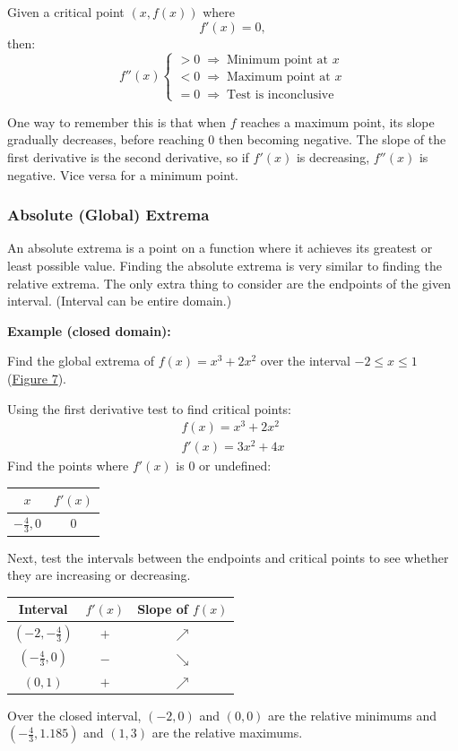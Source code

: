 \documentclass[12pt]{article}
\begin{document}
\noindent Given a critical point $\left( x, f(x) \right)$ where
\[ f'(x) = 0, \]
then:
\[ f''(x) \begin{cases}
        >0 \; \Rightarrow \; \text{Minimum point at $x$} \\
        <0 \; \Rightarrow \; \text{Maximum point at $x$} \\
        =0 \; \Rightarrow \; \text{Test is inconclusive}
    \end{cases} \]

One way to remember this is that when $f$ reaches a maximum point, its slope gradually decreases, before reaching $0$ then becoming negative. The slope of the first derivative is the second derivative, so if $f'(x)$ is decreasing, $f''(x)$ is negative. Vice versa for a minimum point.

\subsubsection{Absolute (Global) Extrema}
An absolute extrema is a point on a function where it achieves its greatest or least possible value. Finding the absolute extrema is very similar to finding the relative extrema. The only extra thing to consider are the endpoints of the given interval. (Interval can be entire domain.)

\noindent \textbf{Example (closed domain):}

\noindent Find the global extrema of $f(x) = x^3+2x^2$ over the interval $-2 \le x \le 1$ (\hyperref[fig:absextremaclosed]{Figure 7}).

\noindent Using the first derivative test to find critical points:
\begin{gather*}
    f(x) = x^3 + 2x^2 \\
    f'(x) = 3x^2 + 4x
\end{gather*}
Find the points where $f'(x)$ is $0$ or undefined:
\begin{center}
    \begin{tabular}{|c|c|}
        \hline
        $x$               & $f'(x)$ \\
        \hline \hline
        $-\frac{4}{3}, 0$ & $0$     \\
        \hline
    \end{tabular}
\end{center}
Next, test the intervals between the endpoints and critical points to see whether they are increasing or decreasing.
\begin{center}
    \begin{tabular}{|c|c|c|}
        \hline
        Interval             & $f'(x)$ & Slope of $f(x)$ \\
        \hline \hline
        $(-2, -\frac{4}{3})$ & $+$     & $\nearrow$      \\
        \hline
        $(-\frac{4}{3}, 0)$  & $-$     & $\searrow$      \\
        \hline
        $(0, 1)$             & $+$     & $\nearrow$      \\
        \hline
    \end{tabular}
\end{center}
Over the closed interval, $(-2, 0)$ and $(0, 0)$ are the relative minimums and $(-\frac{4}{3}, 1.185)$ and $(1, 3)$ are the relative maximums.
\end{document}
